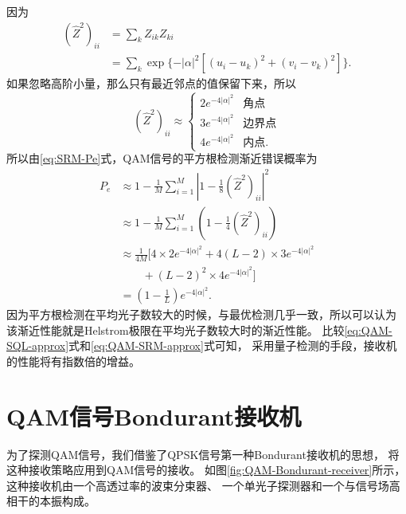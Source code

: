 因为
\begin{equation}
\begin{split}
(\hat{Z}^2)_{ii} &= \sum_k Z_{ik}Z_{ki}    \\
                 &=\sum_k \exp\{- |\alpha|^2 [(u_i-u_k)^2 + (v_i-v_k)^2]\}.
\end{split}
\end{equation}
如果忽略高阶小量，那么只有最近邻点的值保留下来，所以
\begin{equation}
(\hat{Z}^2)_{ii} \approx \begin{cases}
                            2 e^{- 4|\alpha|^2} & \text{角点} \\
                            3 e^{- 4|\alpha|^2} & \text{边界点} \\
                            4 e^{- 4|\alpha|^2} & \text{内点} .
                         \end{cases}
\end{equation}
所以由\ref{eq:SRM-Pe}式，QAM信号的平方根检测渐近错误概率为
\begin{equation}
\begin{split}
P_e & \approx 1 - \frac{1}{M}\sum_{i=1}^M |1 - \frac{1}{8} (\hat{Z}^2)_{ii}|^2 \\
   & \approx 1 - \frac{1}{M}\sum_{i=1}^M (1 - \frac{1}{4} (\hat{Z}^2)_{ii}) \\
   & \approx  \frac{1}{4M} [4\times 2e^{- 4|\alpha|^2} + 4(L-2) \times 3e^{- 4|\alpha|^2} \\
   & \qquad  + (L-2)^2 \times 4e^{- 4|\alpha|^2}] \\
   & =      (1 - \frac{1}{L})  e^{- 4|\alpha|^2}. 
\label{eq:QAM-SRM-approx}   
\end{split}
\end{equation}
因为平方根检测在平均光子数较大的时候，与最优检测几乎一致，所以可以认为
该渐近性能就是Helstrom极限在平均光子数较大时的渐近性能。
比较\ref{eq:QAM-SQL-approx}式和\ref{eq:QAM-SRM-approx}式可知，
采用量子检测的手段，接收机的性能将有指数倍的增益。

\section{QAM信号Bondurant接收机}
为了探测QAM信号，我们借鉴了QPSK信号第一种Bondurant接收机的思想，
将这种接收策略应用到QAM信号的接收。
如图\ref{fig:QAM-Bondurant-receiver}所示，这种接收机由一个高透过率的波束分束器、
一个单光子探测器和一个与信号场高相干的本振构成。

